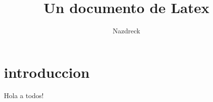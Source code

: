 \documentclass{article}
\title{Un documento de Latex}
\author{Nazdreck}
\date{}
\begin{document}
    \maketitle
    \section{introduccion}
    Hola a todos!
\end{document}
